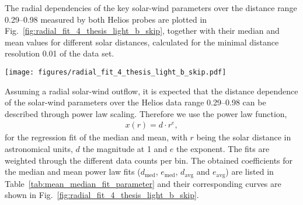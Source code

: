 \documentclass[]{aa}
\begin{document}
        The radial dependencies of the key solar-wind parameters over the distance range \SIrange{0.29}{0.98}{\au} measured by both Helios probes are plotted in Fig.~\ref{fig:radial_fit_4_thesis_light_b_skip}, together with their median and mean values for different solar distances, calculated for the minimal distance resolution \SI{0.01}{\au} of the data set.
        \begin{figure*}
                \texttt{[image: figures/radial\_fit\_4\_thesis\_light\_b\_skip.pdf]}
                \caption{Helios hourly data plots of the four solar wind parameters over solar distance. The mean and median per \SI{0.01}{\au} data bin and their fit curves are plotted as well. The Helios data has a native distance resolution of \SI{0.01}{\au}, thus, to make the distribution visible in these plots, we added a random distance value of up to \SI{+-0.005}{\au}. The high velocity data points above \SI{800}{\km\per\s} (circled red) are identified as CME events \citep[e.g.,][]{Sheeley1985,Bothmer1996,Bothmer1998}.}
                \label{fig:radial_fit_4_thesis_light_b_skip}
        \end{figure*}
        Assuming a radial solar-wind outflow, it is expected that the distance dependence of the solar-wind parameters over the Helios data range \SIrange{0.29}{0.98}{\au} can be described through power law scaling. Therefore we use the power law function,
        \begin{align}
                x(r) = d\cdot r^e,       \label{eq:power_function}
        \end{align}
        for the regression fit of the median and mean, with $r$ being the solar distance in astronomical units, $d$ the magnitude at \SI{1}{\au} and $e$ the exponent. The fits are weighted through the different data counts per bin.
        The obtained coefficients for the median and mean power law fits ($d_\text{med}$, $e_\text{med}$, $d_\text{avg}$ and $e_\text{avg}$) are listed in Table~\ref{tab:mean_median_fit_parameter} and their corresponding curves are shown in Fig.~\ref{fig:radial_fit_4_thesis_light_b_skip}.
\end{document}
